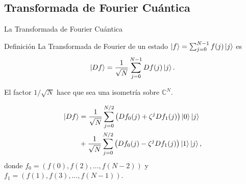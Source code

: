 \documentclass[11pt,compress]{beamer}
\begin{document}
\subsection{Transformada de Fourier Cuántica}

\begin{frame}{La Transformada de Fourier Cuántica}
\begin{block}{Definición}
  La Transformada de Fourier de un estado  $\ket{f} = \sum_{j = 0}^{N-1} f(j) \ket{j}$ es
  \[ \ket{Df} = \frac{1}{\sqrt{N}}\sum_{j = 0}^{N-1} Df(j) \ket{j}. \]
  
  {\color{TurkishRose}El factor $1/\sqrt{N}$ hace que sea una isometría sobre $\mathbb{C}^N$}.
\end{block}

\begin{lemma}
\vspace{-7mm}
\begin{align*} \label{eq:qft}
    \ket{Df} & = \frac{1}{\sqrt{N}} \sum_{j = 0}^{N/2} \left(Df_0(j) +  \zeta^j Df_1(j)\right) \ket{0} \ket{j} \\
    & + \frac{1}{\sqrt{N}} \sum_{j = 0}^{N/2} \left(Df_0(j)  -  \zeta^j Df_1(j)\right) \ket{1} \ket{j}, %
\end{align*}
donde $f_0 = (f(0),f(2),\dots,f(N-2))$ y $f_1 = (f(1),f(3),\dots,f(N-1))$.
\end{lemma}
\end{frame}
\end{document}
